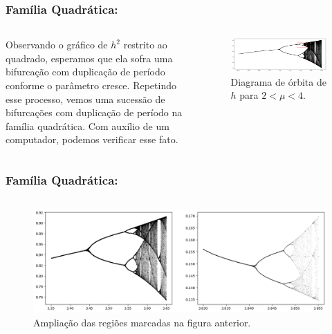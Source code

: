 
\begin{frame}
\vspace{5pt}
\frametitle{Família Quadrática: \subsecname}
\begin{columns}
\column{\dimexpr\paperwidth-15pt}

Observando o gráfico de $h^2$ restrito ao quadrado, esperamos que ela sofra uma bifurcação com duplicação de período conforme o parâmetro cresce. Repetindo esse processo, vemos uma sucessão de bifurcações com duplicação de período na família quadrática. Com auxílio de um computador, podemos verificar esse fato.

\begin{figure}[!htb]
\centering
\includegraphics[scale=0.4]{images/period-doubling-and-zoom1.png}
\caption{Diagrama de órbita de $h$ para $2 < \mu < 4$.}
\end{figure}

\end{columns}
\end{frame}


\begin{frame}
\vspace{5pt}
\frametitle{Família Quadrática: \subsecname}
\begin{columns}
\column{\dimexpr\paperwidth-15pt}

\begin{figure}[H]
\centering
\includegraphics[scale=0.4]{images/period-doubling-and-zoom2.png}
\caption{Ampliação das regiões marcadas na figura anterior.}
\end{figure}

\end{columns}
\end{frame}
